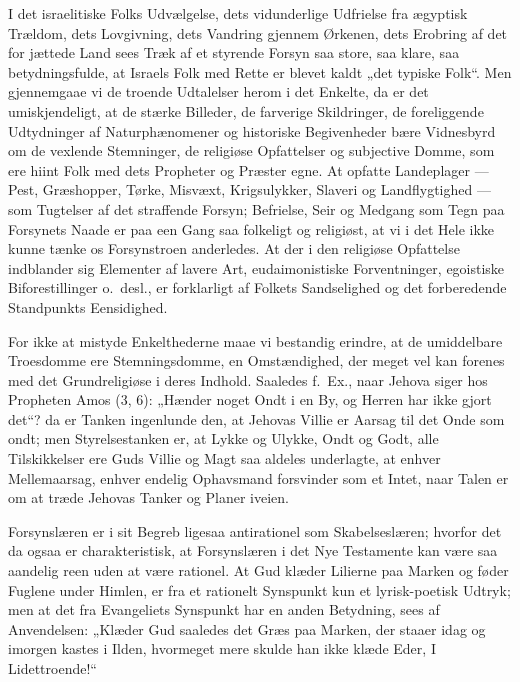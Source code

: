 \documentclass[12pt]{book}
\begin{document}
I det israelitiske Folks Udvælgelse, dets vidunderlige Udfrielse fra
ægyptisk Trældom, dets Lovgivning, dets Vandring gjennem Ørkenen,
dets Erobring af det for\-
jættede Land sees Træk af et styrende Forsyn saa store, saa klare,
saa betydningsfulde, at Israels Folk med Rette er blevet kaldt „det
typiske Folk“. Men gjennemgaae vi de troende Udtalelser herom i det
Enkelte, da er det umiskjendeligt, at de stærke Billeder, de
farverige Skildringer, de foreliggende Udtydninger af
Naturphænomener og historiske Begivenheder bære Vidnesbyrd om de
vexlende Stemninger, de religiøse Opfattelser og subjective Domme,
som ere hiint Folk med dets Propheter og Præster egne. At opfatte
Landeplager --- Pest, Græshopper, Tørke, Misvæxt, Krigsulykker,
Slaveri og Landflygtighed --- som Tugtelser af det straffende
Forsyn; Befrielse, Seir og Medgang som Tegn paa Forsynets Naade er
paa een Gang saa folkeligt og religiøst, at vi i det Hele ikke kunne
tænke os Forsynstroen anderledes. At der i den religiøse Opfattelse
indblander sig Elementer af lavere Art, eudaimonistiske
Forventninger, egoistiske Biforestillinger o.\ desl., er forklarligt
af Folkets Sandselighed og det forberedende Standpunkts
Eensidighed.

For ikke at mistyde Enkelthederne maae vi bestandig erindre, at de
umiddelbare Troesdomme ere Stemningsdomme, en Omstændighed, der
meget vel kan forenes med det Grundreligiøse i deres Indhold.
Saaledes f.\ Ex., naar Jehova siger hos Propheten Amos (3, 6):
„Hænder noget Ondt i en By, og Herren har ikke gjort det“? da er
Tanken ingenlunde den, at Jehovas Villie er Aarsag til det Onde som
ondt; men Styrelsestanken er, at Lykke og Ulykke, Ondt og Godt, alle
Tilskikkelser ere Guds Villie og Magt saa aldeles underlagte, at
enhver Mellemaarsag, enhver endelig Ophavsmand forsvinder som et
Intet, naar Talen er om at træde Jehovas Tanker og Planer iveien.

Forsynslæren er i sit Begreb ligesaa antirationel som
Skabelseslæren; hvorfor det da ogsaa er charakteristisk, at
Forsynslæren i det Nye Testamente kan være saa
aandelig reen uden at være rationel. At Gud klæder Lilierne paa
Marken og føder Fuglene under Himlen, er fra et rationelt Synspunkt
kun et lyrisk-poetisk Udtryk; men at det fra Evangeliets Synspunkt
har en anden Betydning, sees af Anvendelsen: „Klæder Gud saaledes
det Græs paa Marken, der staaer idag og imorgen kastes i Ilden,
hvormeget mere skulde han ikke klæde Eder, I Lidettroende!“
\end{document}
